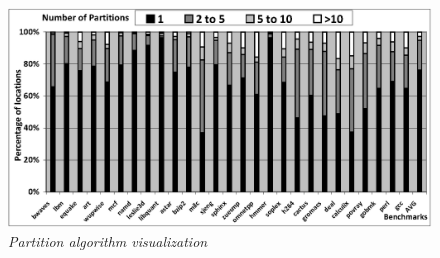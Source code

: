 
\begin{figure}[b]
{
\vspace{-2ex}
\centering
\includegraphics[width=0.8\linewidth]{figures/EPS/partition-visualization-2.eps}
\caption{\textit{Partition algorithm visualization }}
\label{fig:PartResult}
}
\vspace{-3ex}
\end{figure}




